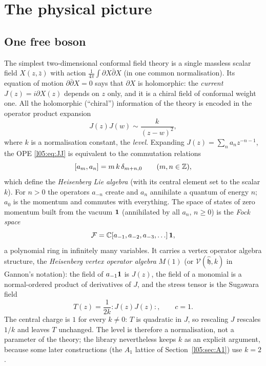\section{The physical picture}\label{l05:sec:physics}

\subsection{One free boson}

The simplest two-dimensional conformal field theory is a single massless scalar field
$X(z,\bar z)$ with action $\frac{1}{4\pi}\int\partial X\bar\partial X$ (in one common normalisation).
Its equation of motion $\partial\bar\partial X=0$ says that $\partial X$ is holomorphic: the
\emph{current} $J(z)=i\partial X(z)$ depends on $z$ only, and it is a chiral field of conformal
weight one. All the holomorphic (``chiral'') information of the theory is encoded in the
operator product expansion
\begin{equation}\label{l05:eq:JJ}
 J(z)J(w)\sim\frac{k}{(z-w)^2},
\end{equation}
where $k$ is a normalisation constant, the \emph{level}. Expanding $J(z)=\sum_n a_nz^{-n-1}$, the
OPE \eqref{l05:eq:JJ} is equivalent to the commutation relations
\begin{equation}\label{l05:eq:heis}
 [a_m,a_n]=m\,k\,\delta_{m+n,0}\qquad(m,n\in{\mathbb{Z}}),
\end{equation}
which define the \emph{Heisenberg Lie algebra} (with its central element set to the scalar $k$).
For $n>0$ the operators $a_{-n}$ create and $a_n$ annihilate a quantum of energy $n$; $a_0$ is the
momentum and commutes with everything. The space of states of zero momentum built from the vacuum
$\mathbf{1}$ (annihilated by all $a_n$, $n\ge0$) is the \emph{Fock space}
\begin{equation*}
 \mathcal{F}={\mathbb{C}}[a_{-1},a_{-2},a_{-3},\ldots]\,\mathbf{1} ,
\end{equation*}
a polynomial ring in infinitely many variables. It carries a vertex operator algebra structure, the
\emph{Heisenberg vertex operator algebra} $M(1)$ (or $\mathcal V(\hat{\mathfrak h},k)$ in Gannon's
notation): the field of $a_{-1}\mathbf{1}$ is $J(z)$, the field of a monomial is a normal-ordered
product of derivatives of $J$, and the stress tensor is the Sugawara field
\begin{equation}\label{l05:eq:T}
 T(z)=\frac{1}{2k}{:}J(z)J(z){:},\qquad c=1 .
\end{equation}
The central charge is $1$ for every $k\neq0$: $T$ is quadratic in $J$, so rescaling $J$ rescales
$1/k$ and leaves $T$ unchanged. The level is therefore a normalisation, not a parameter of the
theory; the library nevertheless keeps $k$ as an explicit argument, because some later constructions
(the $A_1$ lattice of Section~\ref{l05:sec:A1}) use $k=2$.

